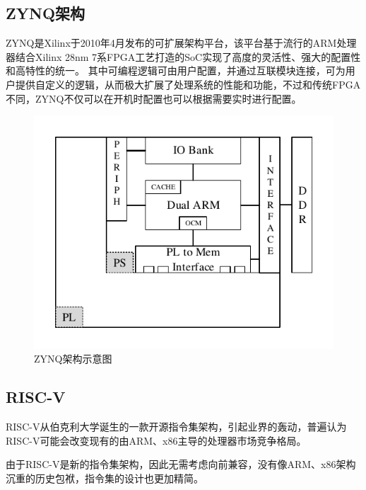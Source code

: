     \subsection{ZYNQ架构}
    ZYNQ是Xilinx于2010年4月发布的可扩展架构平台，该平台基于流行的ARM处理器结合Xilinx 28nm 7系FPGA工艺打造的SoC实现了高度的灵活性、强大的配置性和高特性的统一。
    其中可编程逻辑可由用户配置，并通过互联模块连接，可为用户提供自定义的逻辑，从而极大扩展了处理系统的性能和功能，不过和传统FPGA不同，ZYNQ不仅可以在开机时配置也可以根据需要实时进行配置。
    \begin{figure}[h]
        \centering
        \includegraphics{../pdf/zynq.pdf}
        \caption{ZYNQ架构示意图}
        \label{}
    \end{figure}
    \subsection{RISC-V}
    RISC-V从伯克利大学诞生的一款开源指令集架构，引起业界的轰动，普遍认为RISC-V可能会改变现有的由ARM、x86主导的处理器市场竞争格局。

    由于RISC-V是新的指令集架构，因此无需考虑向前兼容，没有像ARM、x86架构沉重的历史包袱，指令集的设计也更加精简。

